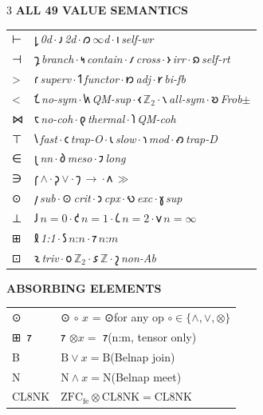 \documentclass[7pt]{article}
\renewcommand{\arraystretch}{0.85}
\newcommand{\shead}[1]{%
  \vspace{2pt}%
  {\fontsize{6pt}{6.5pt}\selectfont\sffamily\bfseries\textcolor{hd}{\MakeUppercase{#1}}}%
  \vspace{0.3pt}\newline{\color{rl}\hrule height 0.2pt}\vspace{1pt}%
}
\newcommand{\sh}[1]{{\Large\shavfont #1}}
\newcommand{\prim}[1]{{\Large\igprimfont #1}}
\begin{document}
\begin{multicols}{3}
\vspace{1pt}
\shead{All 49 Value Semantics}
{\fontsize{5.8pt}{6.8pt}\selectfont
\renewcommand{\arraystretch}{0.85}
\begin{tabular}{@{}l@{\,}p{63mm}@{}}
\prim{⊢} & \sh{𐑛}\,\textit{0d}\,$\cdot$\,\sh{𐑨}\,\textit{2d}\,$\cdot$\,\sh{𐑼}\,\textit{$\infty$d}\,$\cdot$\,\sh{𐑦}\,\textit{self-wr} \\
\prim{⊣} & \sh{𐑡}\,\textit{branch}\,$\cdot$\,\sh{𐑰}\,\textit{contain}\,$\cdot$\,\sh{𐑥}\,\textit{cross}\,$\cdot$\,\sh{𐑶}\,\textit{irr}\,$\cdot$\,\sh{𐑸}\,\textit{self-rt} \\
\prim{>} & \sh{𐑩}\,\textit{superv}\,$\cdot$\,\sh{𐑑}\,\textit{functor}\,$\cdot$\,\sh{𐑽}\,\textit{adj}\,$\cdot$\,\sh{𐑾}\,\textit{bi-fb} \\
\prim{<} & \sh{𐑗}\,\textit{no-sym}\,$\cdot$\,\sh{𐑿}\,\textit{QM-sup}\,$\cdot$\,\sh{𐑬}\,\textit{$\mathbb{Z}_2$}\,$\cdot$\,\sh{𐑯}\,\textit{all-sym}\,$\cdot$\,\sh{𐑹}\,\textit{Frob$\pm$} \\
\prim{⋈} & \sh{𐑱}\,\textit{no-coh}\,$\cdot$\,\sh{𐑞}\,\textit{thermal}\,$\cdot$\,\sh{𐑐}\,\textit{QM-coh} \\
\prim{⊤} & \sh{𐑘}\,\textit{fast}\,$\cdot$\,\sh{𐑤}\,\textit{trap-O}\,$\cdot$\,\sh{𐑧}\,\textit{slow}\,$\cdot$\,\sh{𐑪}\,\textit{mod}\,$\cdot$\,\sh{𐑺}\,\textit{trap-D} \\
\prim{∈} & \sh{𐑚}\,\textit{nn}\,$\cdot$\,\sh{𐑔}\,\textit{meso}\,$\cdot$\,\sh{𐑲}\,\textit{long} \\
\prim{∋} & \sh{𐑝}\,$\wedge$\,$\cdot$\,\sh{𐑜}\,$\vee$\,$\cdot$\,\sh{𐑠}\,$\to$\,$\cdot$\,\sh{𐑵}\,$\gg$ \\
\prim{⊙} & \sh{𐑢}\,\textit{sub}\,$\cdot$\,{\Large⊙}\,\textit{crit}\,$\cdot$\,\sh{𐑮}\,\textit{cpx}\,$\cdot$\,\sh{𐑻}\,\textit{exc}\,$\cdot$\,\sh{𐑣}\,\textit{sup} \\
\prim{⊥} & \sh{𐑓}\,$n{=}0$\,$\cdot$\,\sh{𐑒}\,$n{=}1$\,$\cdot$\,\sh{𐑖}\,$n{=}2$\,$\cdot$\,\sh{𐑫}\,$n{=}\infty$ \\
\prim{⊞} & \sh{𐑙}\,\textit{1:1}\,$\cdot$\,\sh{𐑕}\,$n$:$n$\,$\cdot$\,\sh{𐑳}\,$n$:$m$ \\
\prim{⊡} & \sh{𐑷}\,\textit{triv}\,$\cdot$\,\sh{𐑴}\,$\mathbb{Z}_2$\,$\cdot$\,\sh{𐑭}\,$\mathbb{Z}$\,$\cdot$\,\sh{𐑟}\,\textit{non-Ab} \\
\end{tabular}
}

\vspace{1pt}
\shead{Absorbing Elements}
{\fontsize{6.5pt}{7.8pt}\selectfont
\begin{tabular}{@{}l@{\enspace}l@{}}
\prim{⊙} & ⊙ $\circ$ $x$ = ⊙\enspace for any op $\circ\in\{\wedge,\vee,\otimes\}$ \\
\prim{⊞}~\sh{𐑳} & \sh{𐑳} $\otimes x =$ \sh{𐑳}\enspace (n:m, tensor only) \\
B & $\mathrm{B} \vee x = \mathrm{B}$\enspace (Belnap join) \\
N & $\mathrm{N} \wedge x = \mathrm{N}$\enspace (Belnap meet) \\
CL8NK & $\mathrm{ZFC}_\mathrm{fe} \otimes \mathrm{CL8NK} = \mathrm{CL8NK}$ \\
\end{tabular}
}


\end{multicols}
\end{document}
